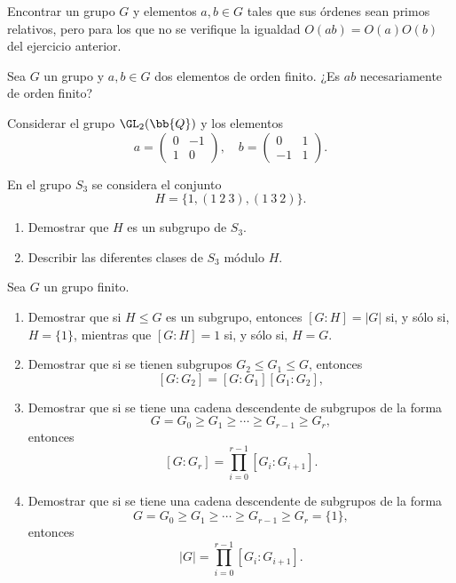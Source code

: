 \begin{ejercicio}\label{ej:3.6}
    Encontrar un grupo $G$ y elementos $a, b \in G$ tales que sus órdenes sean primos relativos, pero para los que no se verifique la igualdad $O(ab) = O(a)O(b)$ del ejercicio anterior.
\end{ejercicio}

\begin{ejercicio}\label{ej:3.7}
    Sea $G$ un grupo y $a, b \in G$ dos elementos de orden finito. ¿Es $ab$ necesariamente de orden finito?
    \begin{observacion}
        Considerar el grupo $\GL_2(\bb{Q})$ y los elementos
        \[
            a = \begin{pmatrix}
                0 & -1 \\
                1 & 0
            \end{pmatrix}, \quad b = \begin{pmatrix}
                0 & 1 \\
                -1 & 1
            \end{pmatrix}.
        \]
    \end{observacion}
\end{ejercicio}

\begin{ejercicio}\label{ej:3.8}
    En el grupo $S_3$ se considera el conjunto
    \[
        H = \{1, (1\ 2\ 3), (1\ 3\ 2)\}.
    \]
    \begin{enumerate}
        \item Demostrar que $H$ es un subgrupo de $S_3$.
        \item Describir las diferentes clases de $S_3$ módulo $H$.
    \end{enumerate}
\end{ejercicio}

\begin{ejercicio}\label{ej:3.9}
    Sea $G$ un grupo finito.
    \begin{enumerate}
        \item Demostrar que si $H \leq G$ es un subgrupo, entonces $[G : H] = |G|$ si, y sólo si, $H = \{1\}$, mientras que $[G : H] = 1$ si, y sólo si, $H = G$.
        \item Demostrar que si se tienen subgrupos $G_2 \leq G_1 \leq G$, entonces
        \[
            [G : G_2] = [G : G_1][G_1 : G_2],
        \]
        \item Demostrar que si se tiene una cadena descendente de subgrupos de la forma
        \[
            G = G_0 \geq G_1 \geq \cdots \geq G_{r - 1} \geq G_r,
        \]
        entonces
        \[
            [G : G_r] = \prod_{i = 0}^{r - 1}[G_i : G_{i + 1}].
        \]
        \item Demostrar que si se tiene una cadena descendente de subgrupos de la forma
        \[
            G = G_0 \geq G_1 \geq \cdots \geq G_{r - 1} \geq G_r = \{1\},
        \]
        entonces
        \[
            |G| = \prod_{i = 0}^{r - 1}[G_i : G_{i + 1}].
        \]
    \end{enumerate}
\end{ejercicio}

